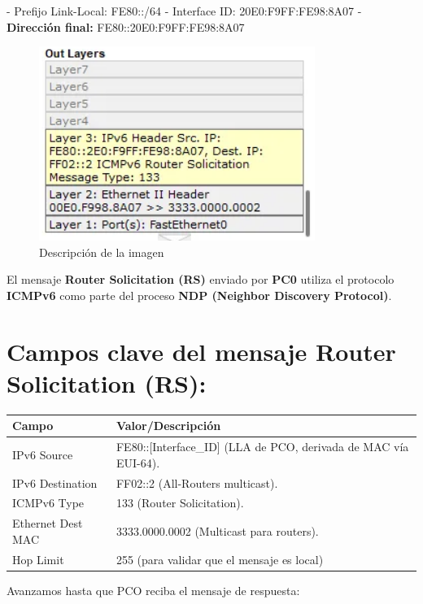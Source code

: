 \documentclass{article}
\begin{document}
- Prefijo Link-Local:  FE80::/64
- Interface ID:  20E0:F9FF:FE98:8A07
- \textbf{Dirección final:}  FE80::20E0:F9FF:FE98:8A07

\begin{figure}[h]
    \centering
    \includegraphics[width=0.8\textwidth]{imagen1.PNG}
    \caption{Descripción de la imagen}
    \label{fig:ejemplo}
\end{figure}


El mensaje \textbf{Router Solicitation (RS)} enviado por \textbf{PC0} utiliza el protocolo \textbf{ICMPv6} como parte del proceso \textbf{NDP (Neighbor Discovery Protocol)}.

\section*{Campos clave del mensaje Router Solicitation (RS):}
\begin{tabular}{|l|l|}
\hline
Campo & Valor/Descripción \\
\hline
IPv6 Source & FE80::[Interface\_ID]  (LLA de PCO, derivada de MAC vía EUI-64). \\
IPv6 Destination & FF02::2  (All-Routers multicast). \\
ICMPv6 Type & 133  (Router Solicitation). \\
Ethernet Dest MAC & 3333.0000.0002  (Multicast para routers). \\
Hop Limit & 255  (para validar que el mensaje es local) \\
\hline
\end{tabular}
Avanzamos hasta que PCO reciba el mensaje de respuesta:
\end{document}
